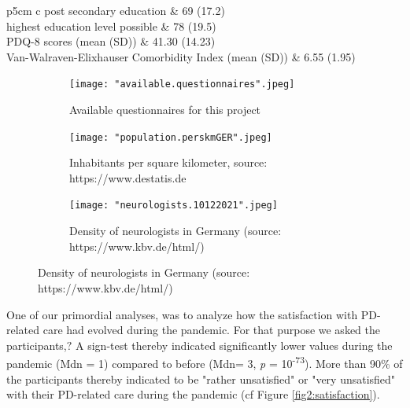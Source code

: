 \documentclass{bmcart}
\begin{document}
\begin{table}[!ht]
\begin{tabular}{p{5cm} c}
\hspace{3mm} post secondary education  										&   	69 (17.2) 		\\ \hline
\hspace{3mm} highest education level possible 										& 	78 (19.5)  		\\ \hline
\hspace{3mm} PDQ-8 scores (mean (SD)) 										& 	41.30 (14.23) 	\\ \hline
Van-Walraven-Elixhauser \newline \hspace{3mm} Comorbidity Index (mean (SD)) 	& 	6.55 (1.95) 		\\ 
\bottomrule
\caption{Demographics of subjects filling out questionnaire:}
\label{tab1:demographics}
\end{tabular}
\end{table}

\begin{figure}
    \centering
    \begin{subfigure}[b]{0.35\linewidth}
        \texttt{[image: "available.questionnaires".jpeg]}
        \caption{Available questionnaires for this project}
        \label{fig1:questionnaires}
    \end{subfigure}%
    \begin{subfigure}[b]{0.35\linewidth}
        \texttt{[image: "population.perskmGER".jpeg]}
        \caption{Inhabitants per square kilometer, source: https://www.destatis.de}
        \label{fig1:population}
    \end{subfigure}%
    \begin{subfigure}[b]{0.35\linewidth}
        \texttt{[image: "neurologists.10122021".jpeg]}
        \caption{Density of neurologists in Germany (source: https://www.kbv.de/html/)}
        \label{fig1:neurologists}
    \end{subfigure}%
\end{figure}

One of our primordial analyses, was to analyze how the satisfaction with PD-related care had evolved during the pandemic. For that purpose we asked the participants,$?$ %
A sign-test thereby indicated significantly lower values during the pandemic (Mdn = 1) compared to before (Mdn= 3, \textit{p} = 10\textsuperscript{-73}). More than 90\% of the participants thereby indicated to be "rather unsatisfied" or "very unsatisfied" with their PD-related care during the pandemic (cf Figure \ref{fig2:satisfaction}).
\end{document}
